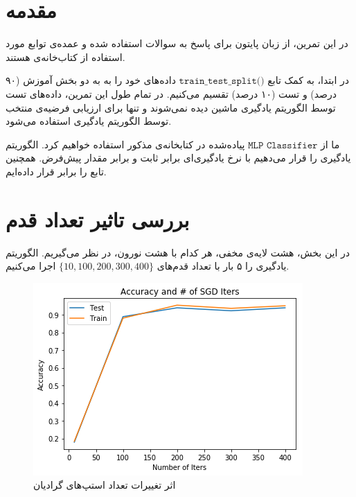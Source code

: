 \documentclass[a4paper]{article}
\begin{document}
\begin{large}
\section{مقدمه}
در این تمرین، از زبان پایتون برای پاسخ به سوالات استفاده شده و عمده‌ی توابع مورد استفاده از کتاب‌خانه‌ی
 هستند. 
 
در ابتدا، به کمک تابع
$\texttt{train\_test\_split()}$
داده‌های خود را به به دو بخش آموزش (۹۰ درصد) و تست (۱۰ درصد) تقسیم می‌کنیم. در تمام طول این تمرین، داده‌های تست توسط الگوریتم یادگیری ماشین دیده‌ نمی‌شوند و تنها برای  ارزیابی فرضیه‌ی منتخب توسط الگوریتم‌ یادگیری استفاده می‌شود.

ما از 
$\texttt{MLP Classifier}$
پیاده‌شده در کتابخانه‌ی مذکور استفاده خواهیم کرد. الگوریتم‌ یادگیری را 
قرار می‌دهیم با نرخ یادگیری‌ای برابر ثابت و برابر مقدار پیش‌فرض. همچنین تابع 
را برابر 
قرار داده‌ایم.


\section{بررسی تاثیر تعداد قدم}
در این بخش، هشت لایه‌ی مخفی، هر کدام با هشت نورون، در نظر می‌گیریم. الگوریتم‌ یادگیری را ۵ بار با تعداد ‌قدم‌های 
$\{10,100,200,300,400\}$
اجرا می‌کنیم. 

\begin{figure}[h!]
	\centering
	\includegraphics[scale=0.7]{1.png}
	\caption{اثر تغییرات تعداد استپ‌های گرادیان}
\end{figure}


\end{large}
\end{document}
